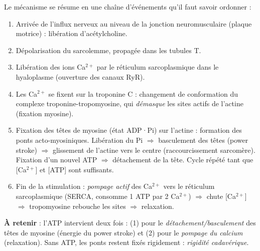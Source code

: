\documentclass[11pt]{article}
\newcommand{\cle}[1]{{\popxbold\color{popdark}#1}}
\begin{document}
\begin{methode}
Le mécanisme se résume en une chaîne d'événements qu'il faut savoir ordonner :
\begin{enumerate}
\item \cle{Arrivée de l'influx nerveux} au niveau de la jonction neuromusculaire (plaque motrice) : libération d'\cle{acétylcholine}.
\item \cle{Dépolarisation} du sarcolemme, propagée dans les tubules T.
\item \cle{Libération des ions Ca$^{2+}$} par le réticulum sarcoplasmique dans le hyaloplasme (ouverture des canaux RyR).
\item Les Ca$^{2+}$ se fixent sur la \cle{troponine C} : changement de conformation du complexe troponine-tropomyosine, qui \emph{démasque} les sites actifs de l'actine (fixation myosine).
\item Fixation des \cle{têtes de myosine} (état ADP·Pi) sur l'actine : formation des \cle{ponts acto-myosiniques}. Libération du Pi $\Rightarrow$ \cle{basculement} des têtes (power stroke) $\Rightarrow$ glissement de l'actine vers le centre (raccourcissement sarcomère). Fixation d'un nouvel ATP $\Rightarrow$ détachement de la tête. Cycle répété tant que [Ca$^{2+}$] et [ATP] sont suffisants.
\item Fin de la stimulation : \emph{pompage actif} des Ca$^{2+}$ vers le réticulum sarcoplasmique (SERCA, consomme 1 ATP par 2 Ca$^{2+}$) $\Rightarrow$ chute [Ca$^{2+}$] $\Rightarrow$ tropomyosine rebouche les sites $\Rightarrow$ \cle{relaxation}.
\end{enumerate}
\textbf{À retenir} : l'ATP intervient deux fois : (1) pour le \emph{détachement/basculement} des têtes de myosine (énergie du power stroke) et (2) pour le \emph{pompage du calcium} (relaxation). Sans ATP, les ponts restent fixés rigidement : \emph{rigidité cadavérique}.
\end{methode}
\end{document}
